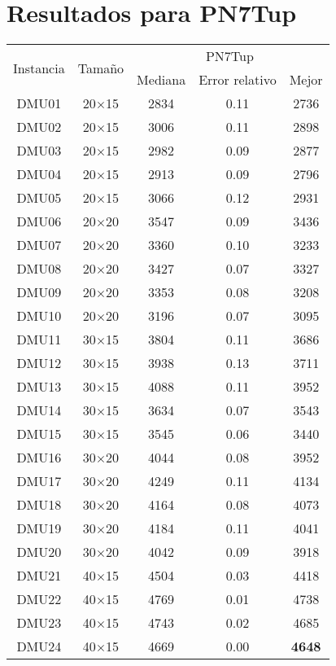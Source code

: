 \section{Resultados para PN7Tup}

\begin{table}[H]
\centering
\begin{tabular}{@{}ccccc@{}}
\toprule
\multirow{2}{*}{Instancia} & \multirow{2}{*}{Tamaño} & \multicolumn{3}{c}{ PN7Tup} \\ \cmidrule(lr){3-5}
& & Mediana& Error relativo & Mejor  \\ \midrule
DMU01 & 20$\times$15 & 2834 & 0.11 & 2736\\ 
DMU02 & 20$\times$15 & 3006 & 0.11 & 2898\\ 
DMU03 & 20$\times$15 & 2982 & 0.09 & 2877\\ 
DMU04 & 20$\times$15 & 2913 & 0.09 & 2796\\ 
DMU05 & 20$\times$15 & 3066 & 0.12 & 2931\\ 
DMU06 & 20$\times$20 & 3547 & 0.09 & 3436\\ 
DMU07 & 20$\times$20 & 3360 & 0.10 & 3233\\ 
DMU08 & 20$\times$20 & 3427 & 0.07 & 3327\\ 
DMU09 & 20$\times$20 & 3353 & 0.08 & 3208\\ 
DMU10 & 20$\times$20 & 3196 & 0.07 & 3095\\ 
DMU11 & 30$\times$15 & 3804 & 0.11 & 3686\\ 
DMU12 & 30$\times$15 & 3938 & 0.13 & 3711\\ 
DMU13 & 30$\times$15 & 4088 & 0.11 & 3952\\ 
DMU14 & 30$\times$15 & 3634 & 0.07 & 3543\\ 
DMU15 & 30$\times$15 & 3545 & 0.06 & 3440\\ 
DMU16 & 30$\times$20 & 4044 & 0.08 & 3952\\ 
DMU17 & 30$\times$20 & 4249 & 0.11 & 4134\\ 
DMU18 & 30$\times$20 & 4164 & 0.08 & 4073\\ 
DMU19 & 30$\times$20 & 4184 & 0.11 & 4041\\ 
DMU20 & 30$\times$20 & 4042 & 0.09 & 3918\\ 
DMU21 & 40$\times$15 & 4504 & 0.03 & 4418\\ 
DMU22 & 40$\times$15 & 4769 & 0.01 & 4738\\ 
DMU23 & 40$\times$15 & 4743 & 0.02 & 4685\\ 
DMU24 & 40$\times$15 & 4669 & 0.00 & \textbf{4648}\\ 

\end{tabular}
\end{table}
